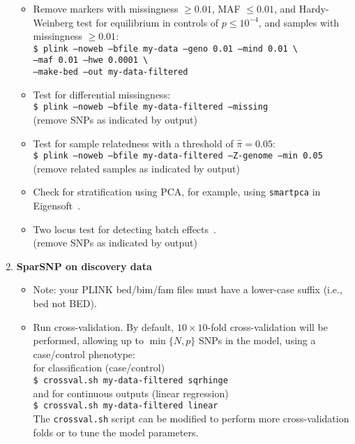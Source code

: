 \documentclass[a4paper,11pt]{article}
\begin{document}
\begin{enumerate}
      \begin{itemize}

      \item Remove markers with missingness $\ge 0.01$, MAF $\le 0.01$, and
      Hardy-Weinberg test for equilibrium in
      controls of $p\le 10^{-4}$, and samples with missingness $\ge 0.01$: \\
      \texttt{\$ plink --noweb --bfile my-data --geno 0.01 --mind 0.01
      \textbackslash \\ --maf 0.01 --hwe
      0.0001 \textbackslash \\
      --make-bed --out my-data-filtered
      }

      \item Test for differential missingness: \\
      \texttt{\$ plink --noweb --bfile my-data-filtered --missing} \\
      (remove SNPs as indicated by output)

      \item Test for sample relatedness with a threshold of $\hat{\pi}=0.05$: \\
      \texttt{\$ plink --noweb --bfile my-data-filtered --Z-genome --min 0.05} \\
      (remove related samples as indicated by output)

      \item Check for stratification using PCA, for example, using
      \texttt{smartpca} in Eigensoft~\citep{price2006}.

      \item Two locus test for detecting batch effects~\citep{lee2010b}. \\
      (remove SNPs as indicated by output)

      \end{itemize}

   \item \textbf{SparSNP on discovery data}


      \begin{itemize}

	 \item Note: your PLINK bed/bim/fam files must have a lower-case suffix
	 (i.e., bed not BED).

	 \item Run cross-validation. By default, $10\times10$-fold
	 cross-validation will be performed, allowing up to $\min \{N, p\}$ SNPs
	 in the model, using a case/control phenotype: \\ for classification
	 (case/control)\\ \texttt{\$ crossval.sh my-data-filtered sqrhinge}\\
	 and for continuous outputs (linear regression)\\ \texttt{\$ crossval.sh
	 my-data-filtered linear}\\ The \texttt{crossval.sh} script can be
	 modified to perform more cross-validation folds or to tune the model
	 parameters.


\end{itemize}
\end{enumerate}
\end{document}
